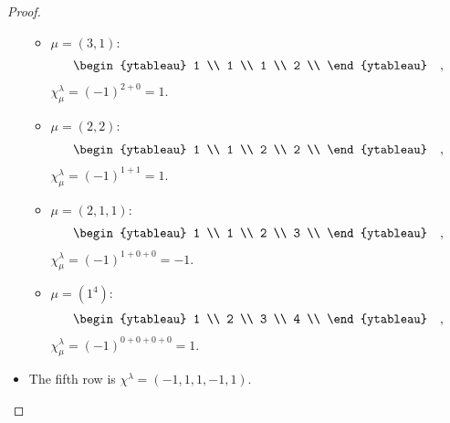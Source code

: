 \documentclass[8pt]{extarticle}
\newcommand{\<}{\langle}
\renewcommand{\>}{\rangle}
\theoremstyle{definition}
\begin{document}
\begin{proof}
\begin{itemize}
\begin{itemize}
    \item
      $\mu = (3,1)$:
      \begin{align*}
        \begin{ytableau}
          1 \\
          1 \\
          1 \\
          2 \\
        \end{ytableau}\quad,
      \end{align*}
      $\chi_\mu^{\lambda} = (-1)^{2+0} = 1$.

    \item
      $\mu = (2,2)$:
      \begin{align*}
        \begin{ytableau}
          1 \\
          1 \\
          2 \\
          2 \\
        \end{ytableau}\quad,
      \end{align*}
      $\chi_\mu^{\lambda} = (-1)^{1+1} = 1$.

    \item
      $\mu = (2,1,1)$:
      \begin{align*}
        \begin{ytableau}
          1 \\
          1 \\
          2 \\
          3 \\
        \end{ytableau}\quad,
      \end{align*}
      $\chi_\mu^{\lambda} = (-1)^{1+0+0} = -1$.

    \item
      $\mu = (1^4)$:
      \begin{align*}
        \begin{ytableau}
          1 \\
          2 \\
          3 \\
          4 \\
        \end{ytableau}\quad,
      \end{align*}
      $\chi_\mu^{\lambda} = (-1)^{0+0+0+0} = 1$.                        
    \end{itemize}
  \item
    The fifth row is $\chi^{\lambda} = (-1,1,1,-1,1)$.
  \end{itemize}


\end{proof}
\end{document}
